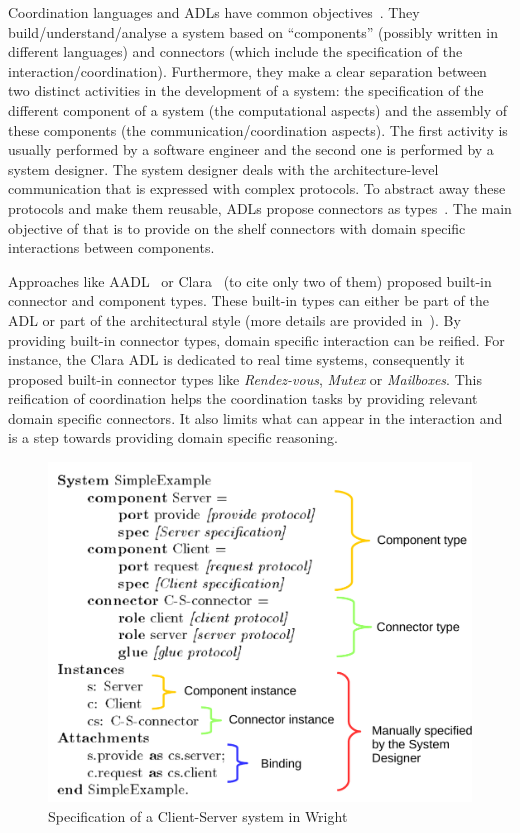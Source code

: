 Coordination languages and ADLs have common objectives~\cite{coordmodels}. They build/understand/analyse a system based on ``components'' (possibly written in different languages) and connectors (which include the specification of the interaction/coordination). Furthermore, they make a clear separation between two distinct activities in the development of a system: the specification of the different component of a system (\ie the computational aspects) and the assembly of these components (\ie the communication/coordination aspects). The first activity is usually performed by a software engineer and the second one is performed by a system designer. The system designer deals with the architecture-level communication that is expressed with complex protocols. To abstract away these protocols and make them reusable, ADLs propose connectors as types~\cite{frameadlsbib}. The main objective of that is to provide on the shelf connectors with domain specific interactions between components. 
			
Approaches like AADL~\cite{aadlbib} or Clara~\cite{clarabib} (to cite only two of them) proposed built-in connector and component types. These built-in types can either be part of the ADL or part of the architectural style (more details are provided in~\cite{taxonomyConnectors}). By providing built-in connector types, domain specific interaction can be reified. For instance, the Clara ADL is dedicated to real time systems, consequently it proposed built-in connector types like \emph{Rendez-vous}, \emph{Mutex} or \emph{Mailboxes}. This reification of coordination helps the coordination tasks by providing relevant domain specific connectors. It also limits what can appear in the interaction and is a step towards providing domain specific reasoning.
			
			
			\begin{figure}
				\begin{center}
					\includegraphics[width=0.5\columnwidth]{background/figs/wrightspec}
					\caption{Specification of a Client-Server system in Wright~\cite{wrightbib}}
					\label{fig:wrightspec}
				\end{center}
			\end{figure}
			
